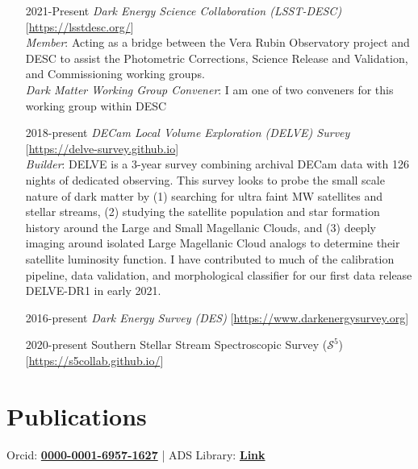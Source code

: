 \documentclass[11pt,letterpaper, sans]{moderncv}        %
\let\oldhref\href
\renewcommand{\href}[2]{\oldhref{#1}{\bfseries#2}}
\begin{document}
\begin{itemize}[itemsep=1pt, leftmargin=65pt]
\begin{itemize}
    \end{itemize}
    \item [2021-Present] \emph{Dark Energy Science Collaboration (LSST-DESC)} [\url{https://lsstdesc.org/}]\\
    \emph{Member}: Acting as a bridge between the Vera Rubin Observatory project and DESC to assist the Photometric Corrections, Science Release and Validation, and Commissioning working groups. \\
    \emph{Dark Matter Working Group Convener}: I am one of two conveners for this working group within DESC
    \item [2018-present] \emph{DECam Local Volume Exploration (DELVE) Survey} [\url{https://delve-survey.github.io}]\\
    \emph{Builder}: DELVE is a 3-year survey combining archival DECam data with 126 nights of dedicated observing. This survey looks to probe the small scale nature of dark matter by (1) searching for ultra faint MW satellites and stellar streams, (2) studying the satellite population and star formation history around the Large and Small Magellanic Clouds, and (3) deeply imaging around isolated Large Magellanic Cloud analogs to determine their satellite luminosity function. I have contributed to much of the calibration pipeline, data validation, and morphological classifier for our first data release DELVE-DR1 in early 2021. 
    
    \item [2016-present] \emph{Dark Energy Survey (DES)} [\url{https://www.darkenergysurvey.org}]\\
    \item [2020-present] Southern Stellar Stream Spectroscopic Survey ($\mathcal{S}^5$) [\url{https://s5collab.github.io/}]\\
\end{itemize}
\vspace*{-4mm}

\section{Publications}
\hspace{1.6in} Orcid: \href{https://orcid.org/0000-0001-6957-1627}{0000-0001-6957-1627} | ADS Library: \href{https://ui.adsabs.harvard.edu/user/libraries/rBhHJF5MTWqIJuR0n-PNKA}{Link}
%

\end{document}
